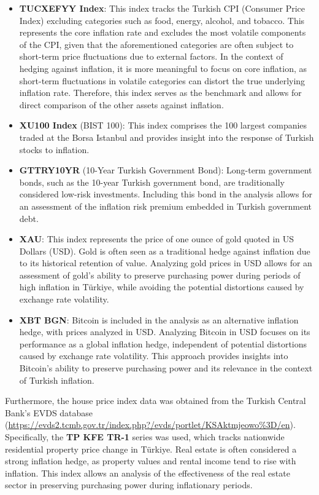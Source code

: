\documentclass[
]{article}
\begin{document}
\begin{itemize}
\item
  \textbf{TUCXEFYY Index}: This index tracks the Turkish CPI (Consumer
  Price Index) excluding categories such as food, energy, alcohol, and
  tobacco. This represents the core inflation rate and excludes the most
  volatile components of the CPI, given that the aforementioned
  categories are often subject to short-term price fluctuations due to
  external factors. In the context of hedging against inflation, it is
  more meaningful to focus on core inflation, as short-term fluctuations
  in volatile categories can distort the true underlying inflation rate.
  Therefore, this index serves as the benchmark and allows for direct
  comparison of the other assets against inflation.
\item
  \textbf{XU100 Index} (BIST 100): This index comprises the 100 largest
  companies traded at the Borsa Istanbul and provides insight into the
  response of Turkish stocks to inflation.
\item
  \textbf{GTTRY10YR} (10-Year Turkish Government Bond): Long-term
  government bonds, such as the 10-year Turkish government bond, are
  traditionally considered low-risk investments. Including this bond in
  the analysis allows for an assessment of the inflation risk premium
  embedded in Turkish government debt.
\item
  \textbf{XAU}: This index represents the price of one ounce of gold
  quoted in US Dollars (USD). Gold is often seen as a traditional hedge
  against inflation due to its historical retention of value. Analyzing
  gold prices in USD allows for an assessment of gold's ability to
  preserve purchasing power during periods of high inflation in Türkiye,
  while avoiding the potential distortions caused by exchange rate
  volatility.
\item
  \textbf{XBT BGN}: Bitcoin is included in the analysis as an
  alternative inflation hedge, with prices analyzed in USD. Analyzing
  Bitcoin in USD focuses on its performance as a global inflation hedge,
  independent of potential distortions caused by exchange rate
  volatility. This approach provides insights into Bitcoin's ability to
  preserve purchasing power and its relevance in the context of Turkish
  inflation.
\end{itemize}

Furthermore, the house price index data was obtained from the Turkish
Central Bank's EVDS database
(\url{https://evds2.tcmb.gov.tr/index.php?/evds/portlet/KSAktmjeowo\%3D/en}).
Specifically, the \textbf{TP KFE TR-1} series was used, which tracks
nationwide residential property price change in Türkiye. Real estate is
often considered a strong inflation hedge, as property values and rental
income tend to rise with inflation. This index allows an analysis of the
effectiveness of the real estate sector in preserving purchasing power
during inflationary periods.
\end{document}
